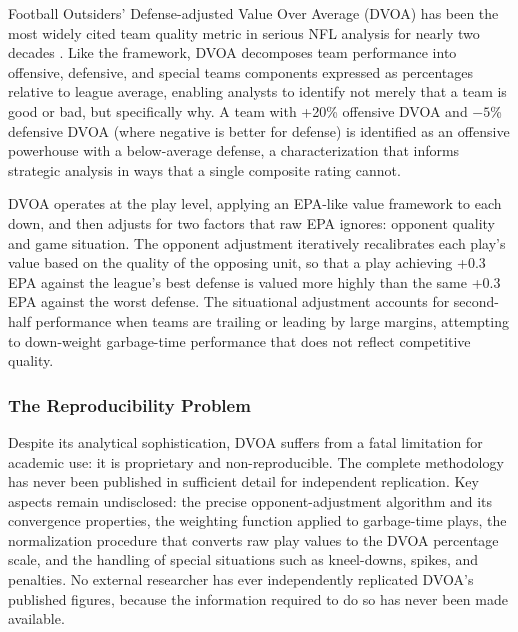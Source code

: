 Football Outsiders' Defense-adjusted Value Over Average (DVOA) has been the most widely cited team quality metric in serious NFL analysis for nearly two decades \parencite{schatz2005dvoa}. Like the \gds{} framework, DVOA decomposes team performance into offensive, defensive, and special teams components expressed as percentages relative to league average, enabling analysts to identify not merely that a team is good or bad, but specifically why. A team with +20\% offensive DVOA and $-5$\% defensive DVOA (where negative is better for defense) is identified as an offensive powerhouse with a below-average defense, a characterization that informs strategic analysis in ways that a single composite rating cannot.

DVOA operates at the play level, applying an EPA-like value framework to each down, and then adjusts for two factors that raw EPA ignores: opponent quality and game situation. The opponent adjustment iteratively recalibrates each play's value based on the quality of the opposing unit, so that a play achieving +0.3 EPA against the league's best defense is valued more highly than the same +0.3 EPA against the worst defense. The situational adjustment accounts for second-half performance when teams are trailing or leading by large margins, attempting to down-weight garbage-time performance that does not reflect competitive quality.

\subsubsection{The Reproducibility Problem}

Despite its analytical sophistication, DVOA suffers from a fatal limitation for academic use: it is proprietary and non-reproducible. The complete methodology has never been published in sufficient detail for independent replication. Key aspects remain undisclosed: the precise opponent-adjustment algorithm and its convergence properties, the weighting function applied to garbage-time plays, the normalization procedure that converts raw play values to the DVOA percentage scale, and the handling of special situations such as kneel-downs, spikes, and penalties. No external researcher has ever independently replicated DVOA's published figures, because the information required to do so has never been made available.

